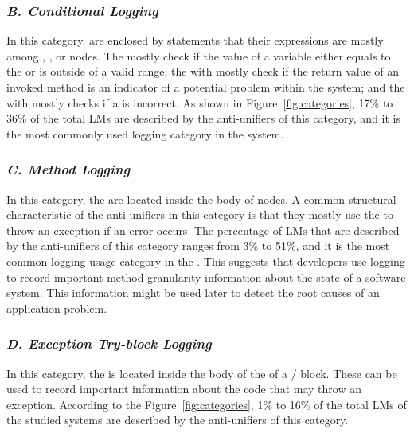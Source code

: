 
\subsubsection{\emph{B. Conditional Logging}}  \label{conditional logging}
In this category,  are enclosed by  statements that their expressions are mostly among  ,  , or   nodes. The   mostly check if the value of a variable either equals to the   or is outside of a valid range; the   with   mostly check if the return value of an invoked method is an indicator of a potential problem within the system; and the   with  mostly checks if a   is incorrect. As shown in Figure~\ref{fig:categories}, 17\% to 36\% of the total LMs are described by the anti-unifiers of this category, and it is the most commonly used logging category in the  system.

\subsubsection{\emph{C. Method Logging}}  \label{method logging}
In this category, the  are located inside the body of  nodes. A common structural characteristic of the anti-unifiers in this category is that they mostly use the  to throw an exception if an error occurs. The percentage of LMs that are described by the anti-unifiers of this category ranges from 3\% to 51\%, and it is the most common logging usage category in the . This suggests that developers use logging to record important method granularity information about the state of a software system. This information might be used later to  detect the root causes of an application problem.

\subsubsection{\emph{D. Exception Try-block Logging}}  \label{Exception try-block logging}
In this category, the  is located inside the body of the   of a / block. These  can be used to record important information about the code that may throw an exception. According to the Figure~\ref{fig:categories}, 1\% to 16\% of the total LMs of the studied systems are described by the anti-unifiers of this category.


